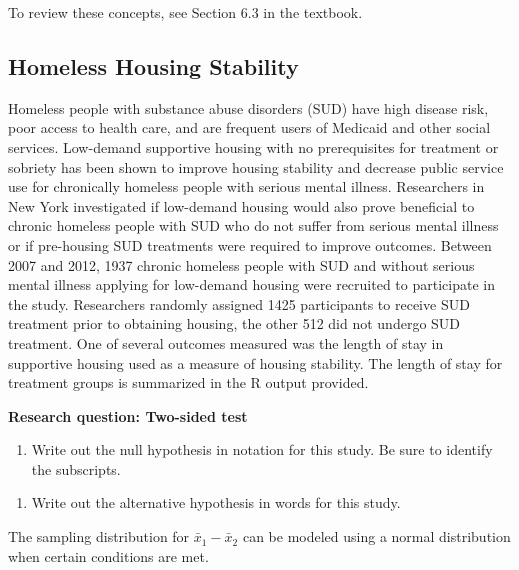 \documentclass[
]{report}
\providecommand{\tightlist}{%
  \setlength{\itemsep}{0pt}\setlength{\parskip}{0pt}}
\begin{document}
To review these concepts, see Section 6.3 in the textbook.

\hypertarget{homeless-housing-stability}{%
\subsection{Homeless Housing Stability}\label{homeless-housing-stability}}

Homeless people with substance abuse disorders (SUD) have high disease risk, poor access to health care, and are frequent users of Medicaid and other social services. Low-demand supportive housing with no prerequisites for treatment or sobriety has been shown to improve housing stability and decrease public service use for chronically homeless people with serious mental illness. Researchers in New York investigated if low-demand housing would also prove beneficial to chronic homeless people with SUD who do not suffer from serious mental illness or if pre-housing SUD treatments were required to improve outcomes. Between 2007 and 2012, 1937 chronic homeless people with SUD and without serious mental illness applying for low-demand housing were recruited to participate in the study. Researchers randomly assigned 1425 participants to receive SUD treatment prior to obtaining housing, the other 512 did not undergo SUD treatment. One of several outcomes measured was the length of stay in supportive housing used as a measure of housing stability. The length of stay for treatment groups is summarized in the R output provided.

\textbf{Research question: Two-sided test}

\begin{enumerate}
\def\labelenumi{\arabic{enumi}.}
\tightlist
\item
  Write out the null hypothesis in notation for this study. Be sure to identify the subscripts.
\end{enumerate}

\vspace{0.5in}

\begin{enumerate}
\def\labelenumi{\arabic{enumi}.}
\setcounter{enumi}{1}
\tightlist
\item
  Write out the alternative hypothesis in words for this study.
\end{enumerate}

\vspace{0.8in}

The sampling distribution for \(\bar{x}_1-\bar{x}_2\) can be modeled using a normal distribution when certain conditions are met.
\end{document}
